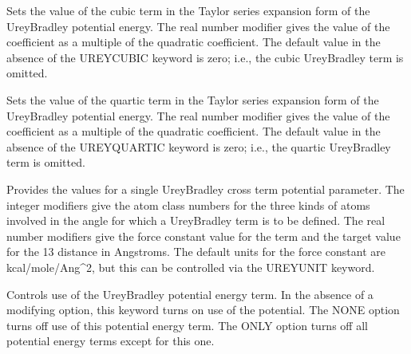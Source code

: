 \documentclass[letterpaper,11pt,english]{sphinxmanual}
\begin{document}
\ignorespaces {}\label{\detokenize{text/keywords:key-urey-cubic}}\begin{description}
\sphinxAtStartPar
Sets the value of the cubic term in the Taylor series expansion form of the Urey\sphinxhyphen{}Bradley potential energy. The real number modifier gives the value of the coefficient as a multiple of the quadratic coefficient. The default value in the absence of the UREY\sphinxhyphen{}CUBIC keyword is zero; i.e., the cubic Urey\sphinxhyphen{}Bradley term is omitted.

\end{description}

\ignorespaces {}\label{\detokenize{text/keywords:key-urey-quartic}}\begin{description}
\sphinxAtStartPar
Sets the value of the quartic term in the Taylor series expansion form of the Urey\sphinxhyphen{}Bradley potential energy. The real number modifier gives the value of the coefficient as a multiple of the quadratic coefficient. The default value in the absence of the UREY\sphinxhyphen{}QUARTIC keyword is zero; i.e., the quartic Urey\sphinxhyphen{}Bradley term is omitted.

\end{description}

\ignorespaces {}\label{\detokenize{text/keywords:key-ureybrad}}\begin{description}
\sphinxAtStartPar
Provides the values for a single Urey\sphinxhyphen{}Bradley cross term potential parameter. The integer modifiers give the atom class numbers for the three kinds of atoms involved in the angle for which a Urey\sphinxhyphen{}Bradley term is to be defined. The real number modifiers give the force constant value for the term and the target value for the 1\sphinxhyphen{}3 distance in Angstroms. The default units for the force constant are kcal/mole/Ang\textasciicircum{}2, but this can be controlled via the UREYUNIT keyword.

\end{description}

\ignorespaces {}\label{\detokenize{text/keywords:key-ureyterm}}\begin{description}
\sphinxAtStartPar
Controls use of the Urey\sphinxhyphen{}Bradley potential energy term. In the absence of a modifying option, this keyword turns on use of the potential. The NONE option turns off use of this potential energy term. The ONLY option turns off all potential energy terms except for this one.

\end{description}
\end{document}
